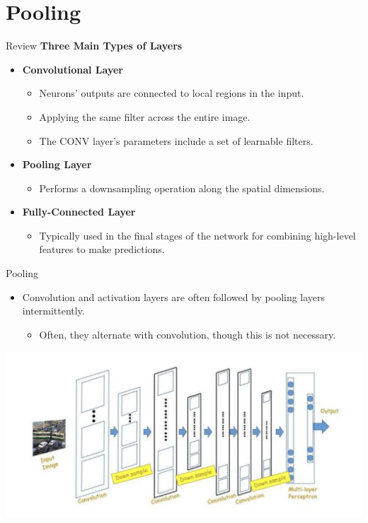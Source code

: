 \documentclass[default, aspectratio=169]{beamer}
\begin{document}
	\section{Pooling}
	\begin{frame}{Review}
		\textbf{Three Main Types of Layers}
		\begin{itemize}
			\item \textbf{Convolutional Layer}
			\begin{itemize}
				\item Neurons' outputs are connected to local regions in the input.
				\item Applying the same filter across the entire image.
				\item The CONV layer's parameters include a set of learnable filters.
			\end{itemize}
			\item \textbf{Pooling Layer}
			\begin{itemize}
				\item Performs a downsampling operation along the spatial dimensions.
			\end{itemize}
			\item \textbf{Fully-Connected Layer}
			\begin{itemize}
				\item Typically used in the final stages of the network for combining high-level features to make predictions.
			\end{itemize}
		\end{itemize}
	\end{frame}
	\begin{frame}{Pooling}
		\begin{itemize}
			\item Convolution and activation layers are often followed by pooling layers intermittently.
			
			\begin{itemize}
				\item Often, they alternate with convolution, though this is not necessary.
			\end{itemize}
		\end{itemize}
		\centering
		\includegraphics[keepaspectratio, scale=0.5]{pic/pooling.png}
	\end{frame}
\end{document}
